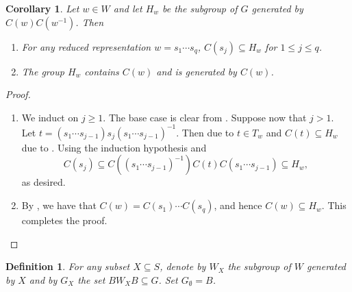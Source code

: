 \documentclass{article}
\theoremstyle{thmstyle}
\theoremstyle{defstyle}
\newtheorem{definition}[theorem]{Definition}
\newtheorem{corollary}[theorem]{Corollary}
\renewcommand{\le}{\leqslant}
\renewcommand{\ge}{\geqslant}
\begin{document}
\begin{corollary}
    Let $w\in W$ and let $H_w$ be the subgroup of $G$ generated by $C(w)C(w^{-1})$. Then 
    \begin{enumerate}[label=(\roman*)]
        \item For any reduced representation $w = s_1\cdots s_q$, $C(s_j)\subseteq H_w$ for $1\le j\le q$. 
        \item The group $H_w$ contains $C(w)$ and is generated by $C(w)$.
    \end{enumerate}
\end{corollary}
\begin{proof}
\begin{enumerate}[label=(\roman*)]
    \item We induct on $j\ge 1$. The base case is clear from . Suppose now that $j > 1$. Let $t = (s_1\cdots s_{j - 1})s_j(s_1\cdots s_{j - 1})^{-1}$. Then due to  $t\in T_w$ and $C(t)\subseteq H_w$ due to . Using the induction hypothesis and 
    \begin{equation*}
        C(s_j)\subseteq C((s_1\cdots s_{j - 1})^{-1})C(t)C(s_{1}\cdots s_{j - 1})\subseteq H_w,
    \end{equation*}
    as desired.

    \item By , we have that $C(w) = C(s_1)\cdots C(s_q)$, and hence $C(w)\subseteq H_w$. This completes the proof. \qedhere
\end{enumerate}
\end{proof}

\begin{definition}
    For any subset $X\subseteq S$, denote by $W_X$ the subgroup of $W$ generated by $X$ and by $G_X$ the set $BW_XB\subseteq G$. Set $G_\emptyset = B$.
\end{definition}
\end{document}

